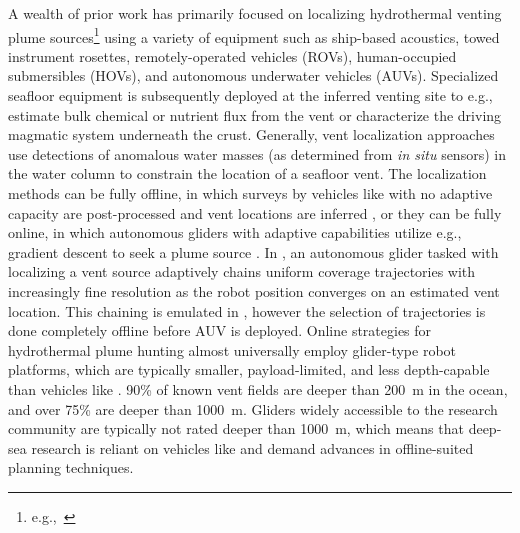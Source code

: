 A wealth of prior work has primarily focused on localizing hydrothermal venting plume sources\footnote{e.g.,~\cite{jakuba2007stochastic, mcgill2011robot, nakamura2013discovery, paduan2018discovery, mason2020evaluation, wang20203, kim2020discovery,ferri2010novel}} using a variety of equipment such as ship-based acoustics, towed instrument rosettes, remotely-operated vehicles (ROVs), human-occupied submersibles (HOVs), and autonomous underwater vehicles (AUVs). Specialized seafloor equipment is subsequently deployed at the inferred venting site to e.g., estimate bulk chemical or nutrient flux from the vent or characterize the driving magmatic system underneath the crust. Generally, vent localization approaches use detections of anomalous water masses (as determined from \emph{in situ} sensors) in the water column to constrain the location of a seafloor vent. The localization methods can be fully offline, in which surveys by vehicles like \Sentry with no adaptive capacity are post-processed and vent locations are inferred \autocite{jakuba2007stochastic,nakamura2013discovery}, or they can be fully online, in which autonomous gliders with adaptive capabilities utilize e.g., gradient descent to seek a plume source \autocite{wang20203}. In \autocite{branch2020demonstration}, an autonomous glider tasked with localizing a vent source adaptively chains uniform coverage trajectories with increasingly fine resolution as the robot position converges on an estimated vent location. This chaining is emulated in \PHORTEX, however the selection of trajectories is done completely offline before AUV \Sentry is deployed. Online strategies for hydrothermal plume hunting almost universally employ glider-type robot platforms, which are typically smaller, payload-limited, and less depth-capable than vehicles like \Sentry. 90\% of known vent fields are deeper than \SI{200}{\meter} in the ocean, and over 75\% are deeper than \SI{1000}{\meter}\autocite{beaulieu2013authoritative}. Gliders widely accessible to the research community are typically not rated deeper than \SI{1000}{\meter}, which means that deep-sea research is reliant on vehicles like \Sentry and demand advances in offline-suited planning techniques.

